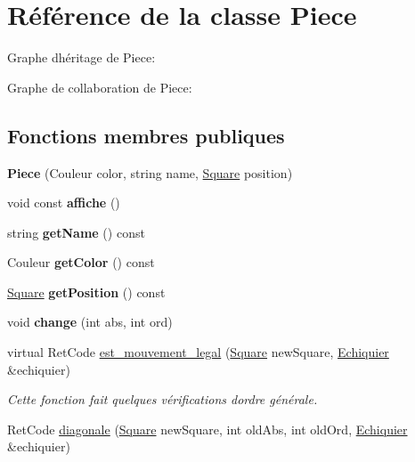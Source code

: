 \hypertarget{classPiece}{}\section{Référence de la classe Piece}
\label{classPiece}


Graphe d\textquotesingle{}héritage de Piece\+:


Graphe de collaboration de Piece\+:
\subsection*{Fonctions membres publiques}
\begin{DoxyCompactItemize}
\item 
\mbox{\label{classPiece_a3d47a1a20d4c7f6d5713d0a04e7f7a49}} 
{\bfseries Piece} (Couleur color, string name, \hyperlink{classSquare}{Square} position)
\item 
\mbox{\label{classPiece_ae486e285af4485a418601ec982e496fb}} 
void const {\bfseries affiche} ()
\item 
\mbox{\label{classPiece_a9a913c322dbd817d69549602c5839a55}} 
string {\bfseries get\+Name} () const
\item 
\mbox{\label{classPiece_a3c662c72321c3459e4c8581801829e54}} 
Couleur {\bfseries get\+Color} () const
\item 
\mbox{\label{classPiece_a410a562af1832a4c7483118e78252ab0}} 
\hyperlink{classSquare}{Square} {\bfseries get\+Position} () const
\item 
\mbox{\label{classPiece_a6f55b91769d8b01aa5a9a720af5d7bf7}} 
void {\bfseries change} (int abs, int ord)
\item 
virtual Ret\+Code \hyperlink{classPiece_a7003f6b90284237191f00bb6038a3bd3}{est\+\_\+mouvement\+\_\+legal} (\hyperlink{classSquare}{Square} new\+Square, \hyperlink{classEchiquier}{Echiquier} \&echiquier)
\begin{DoxyCompactList}\small\item\em Cette fonction fait quelques vérifications d\textquotesingle{}ordre générale. \end{DoxyCompactList}\item 
Ret\+Code \hyperlink{classPiece_abe8171dbb3c0f454d1d70b501e525daa}{diagonale} (\hyperlink{classSquare}{Square} new\+Square, int old\+Abs, int old\+Ord, \hyperlink{classEchiquier}{Echiquier} \&echiquier)

\end{DoxyCompactItemize}
